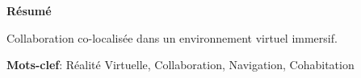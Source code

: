 \centerline{\LARGE \textbf{Résumé}}

\vspace*{\baselineskip}
Collaboration co-localisée dans un environnement virtuel immersif.

\textbf{Mots-clef}: Réalité Virtuelle, Collaboration, Navigation, Cohabitation